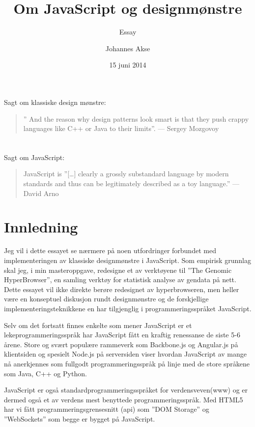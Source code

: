 \documentclass[norsk]{article}
\title{Om JavaScript og designmønstre}
\date {15 juni 2014}
\subtitle{ Essay  }
\author{Johannes Akse}
\begin{document}
\maketitle{}
\newpage
\section*{}
Sagt om klassiske design mønstre:
\begin{quotation}
” And the reason why design patterns look smart is that they push
crappy languages like C++ or Java to their limits”. — Sergey Mozgovoy
\end{quotation}
\section*{}
Sagt om JavaScript:
\begin{quotation}
JavaScript is ”[…] clearly a grossly substandard language by modern
standards and thus can be legitimately described as a toy language.” —
David Arno
\end{quotation}
\newpage
\tableofcontents
\nocite{*}
\newpage
\setcounter{secnumdepth}{0}
\section{Innledning}
Jeg vil i dette essayet se nærmere på noen utfordringer forbundet med implementeringen av klassiske designmønstre i JavaScript. Som empirisk grunnlag skal jeg, i min masteroppgave, redesigne et av verktøyene til ”The Genomic HyperBrowser”, en samling verktøy for statistisk analyse av gendata på nett. Dette essayet vil ikke direkte berøre redesignet av hyperbrowseren, men heller være en konseptuel diskusjon rundt designmønstre og de forskjellige implementeringsteknikkene en har tilgjenglig i programmeringsspråket JavaScript. 

Selv om det fortsatt finnes enkelte som mener JavaScript er et lekeprogrammeringsspråk har JavaScript fått en kraftig renessanse de siste 5-6 årene. Store og svært populære rammeverk som Backbone.js og Angular.js på klientsiden og spesielt Node.js på serversiden viser hvordan JavaScript av mange nå anerkjennes som fullgodt programmeringsspråk på linje med de store språkene som Java, C++ og Python. 

JavaScript er også standardprogrammeringsspråket for verdensveven(www) \parencite[s. 1]{flanagan} og er dermed også et av verdens mest benyttede programmeringsspråk. Med HTML5 har vi fått programmeringsgrensesnitt (api) som ”DOM Storage” og ”WebSockets” som begge er bygget på JavaScript. 
\end{document}
